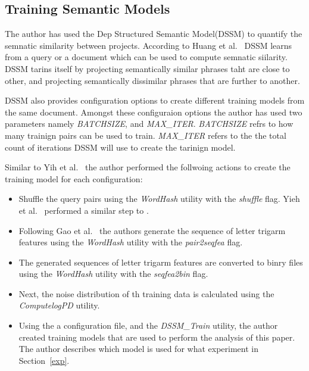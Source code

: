 \documentclass[conference]{IEEEtran}
\begin{document}
\subsection{Training Semantic Models}
\label{train_dssm}
The author has used the Dep Structured Semantic Model(DSSM) to quantify the semnatic similarity between projects. According to Huang et al.~\cite{Huang:CIKM} DSSM learns from a query or a document which can be used to compute semnatic siilarity. DSSM tarins itself by projecting semantically similar phrases taht are close to other, and projecting semantically dissimilar phrases that are further to another. 

DSSM also provides configuration options to create different training models from the same document. Amongst these configuraion options the author has used 
two parameters namely \textit{BATCHSIZE}, and \textit{MAX\_ITER}. \textit{BATCHSIZE} refrs to how many trainign pairs can be used to train. \textit{MAX\_ITER} refers to the the total count of iterations DSSM will use to create the tarinign model.            

Similar to Yih et al.~\cite{wen:tau:semantic:parsing} the author performed the follwoing actions to create the training model for each configuration: 
\begin{itemize}
\item{Shuffle the query pairs using the \textit{WordHash} utility with the \textit{shuffle} flag. Yieh et al.~\cite{wen:yih:semantic:parsing} performed a similar step to .}

\item{Following Gao et al.~\cite{gao:emnlp} the authors generate the sequence of letter trigarm features using the \textit{WordHash} utility with the \textit{pair2seqfea} flag. }

\item{The generated sequences of letter trigarm features are converted to binry files using the \textit{WordHash} utility with the \textit{seqfea2bin} flag. }

\item{Next, the noise distribution of th training data is calculated using the \textit{ComputelogPD} utility.}

\item{Using the a configuration file, and the \textit{DSSM\_Train} utility, the author created training models that are used to perform the analysis of this paper. The author describes which model is used for what experiment in Section~\ref{exp}.}
\end{itemize}
\end{document}
